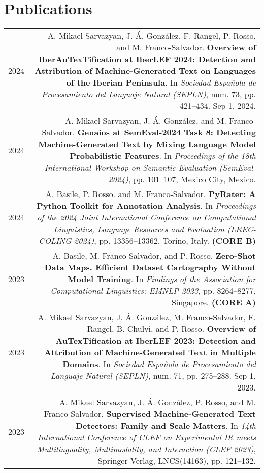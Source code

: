 \documentclass[10pt]{article}
\begin{document}
\section*{Publications}
\begin{tabular}{L!{\VRule}R}
    2024 & A. Mikael Sarvazyan, J. Á. González, F. Rangel, P. Rosso, and M. Franco-Salvador. \textbf{Overview of IberAuTexTification at IberLEF 2024: Detection and Attribution of Machine-Generated Text on Languages of the Iberian Peninsula}. In \emph{Sociedad Española de Procesamiento del Languaje Natural (SEPLN)}, num. 73, pp. 421--434. Sep 1, 2024. \vspace{5pt}\\
    2024 & A. Mikael Sarvazyan, J. Á. González, and M. Franco-Salvador. \textbf{Genaios at SemEval-2024 Task 8: Detecting Machine-Generated Text by Mixing Language Model Probabilistic Features}. In \emph{Proceedings of the 18th International Workshop on Semantic Evaluation (SemEval-2024)}, pp. 101–107, Mexico City, Mexico.  \vspace{5pt}\\
    2024 & A. Basile, P. Rosso. and M. Franco-Salvador. \textbf{PyRater: A Python Toolkit for Annotation Analysis}. In \emph{Proceedings of the 2024 Joint International Conference on Computational Linguistics, Language Resources and Evaluation (LREC-COLING 2024)}, pp. 13356–13362, Torino, Italy. \textbf{(CORE B)}  \vspace{5pt}\\
    2023 & A. Basile, M. Franco-Salvador, and P. Rosso. \textbf{Zero-Shot Data Maps. Efficient Dataset Cartography Without Model Training}. In \emph{Findings of the Association for Computational Linguistics: EMNLP 2023}, pp. 8264–8277, Singapore. \textbf{(CORE A)}  \vspace{5pt}\\
    2023 & A. Mikael Sarvazyan, J. Á. González, M. Franco-Salvador, F. Rangel, B. Chulvi, and P. Rosso. \textbf{Overview of AuTexTification at IberLEF 2023: Detection and Attribution of Machine-Generated Text in Multiple Domains}. In \emph{Sociedad Española de Procesamiento del Languaje Natural (SEPLN)}, num. 71, pp. 275--288. Sep 1, 2023. \vspace{5pt}\\
    2023 & A. Mikael Sarvazyan, J. Á. González, P. Rosso, and M. Franco-Salvador. \textbf{Supervised Machine-Generated Text Detectors: Family and Scale Matters}. In \emph{14th International Conference of CLEF on Experimental IR meets Multilinguality, Multimodality, and Interaction (CLEF 2023)}, Springer-Verlag, LNCS(14163), pp. 121--132. \vspace{5pt}\\

\end{tabular}
\end{document}
